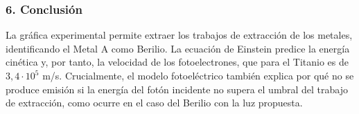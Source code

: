 \subsubsection*{6. Conclusión}
\begin{cajaconclusion}
La gráfica experimental permite extraer los trabajos de extracción de los metales, identificando el Metal A como Berilio. La ecuación de Einstein predice la energía cinética y, por tanto, la velocidad de los fotoelectrones, que para el Titanio es de $3,4 \cdot 10^5$ m/s. Crucialmente, el modelo fotoeléctrico también explica por qué no se produce emisión si la energía del fotón incidente no supera el umbral del trabajo de extracción, como ocurre en el caso del Berilio con la luz propuesta.
\end{cajaconclusion}